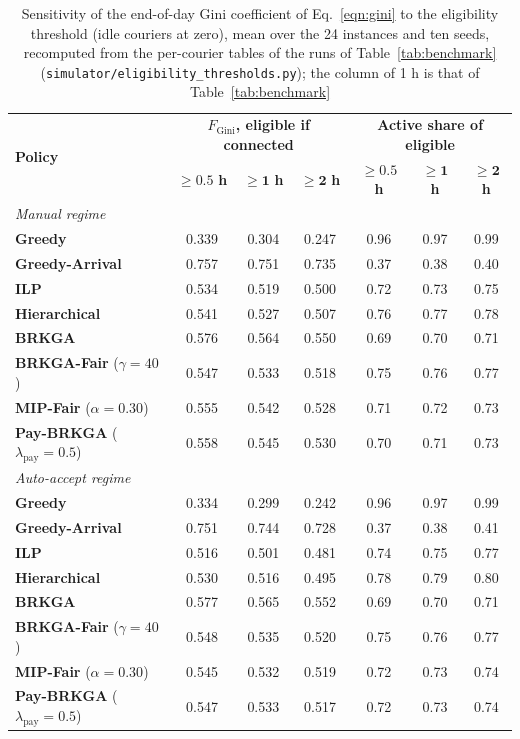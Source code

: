 \documentclass[a4paper,11pt,review,3p,authoryear]{elsarticle}
\newcommand{\FG}{F_{\text{Gini}}}
\begin{document}
\begin{table}[htbp]
\centering
\small
\begin{tabular}{l|ccc|ccc}
\hline
\multirow{2}{*}{\textbf{Policy}} & \multicolumn{3}{c|}{$\FG$\textbf{, eligible if connected}} & \multicolumn{3}{c}{\textbf{Active share of eligible}} \\
 & $\boldsymbol{\ge 0.5}$ \textbf{h} & $\boldsymbol{\ge 1}$ \textbf{h} & $\boldsymbol{\ge 2}$ \textbf{h} & $\boldsymbol{\ge 0.5}$ \textbf{h} & $\boldsymbol{\ge 1}$ \textbf{h} & $\boldsymbol{\ge 2}$ \textbf{h} \\
\hline
\multicolumn{7}{l}{\textit{Manual regime}} \\
\textbf{Greedy} & 0.339 & 0.304 & 0.247 & 0.96 & 0.97 & 0.99 \\
\textbf{Greedy-Arrival} & 0.757 & 0.751 & 0.735 & 0.37 & 0.38 & 0.40 \\
\textbf{ILP} & 0.534 & 0.519 & 0.500 & 0.72 & 0.73 & 0.75 \\
\textbf{Hierarchical} & 0.541 & 0.527 & 0.507 & 0.76 & 0.77 & 0.78 \\
\textbf{BRKGA} & 0.576 & 0.564 & 0.550 & 0.69 & 0.70 & 0.71 \\
\textbf{BRKGA-Fair} ($\gamma = 40$) & 0.547 & 0.533 & 0.518 & 0.75 & 0.76 & 0.77 \\
\textbf{MIP-Fair} ($\alpha = 0.30$) & 0.555 & 0.542 & 0.528 & 0.71 & 0.72 & 0.73 \\
\textbf{Pay-BRKGA} ($\lambda_{\text{pay}} = 0.5$) & 0.558 & 0.545 & 0.530 & 0.70 & 0.71 & 0.73 \\
\hline
\multicolumn{7}{l}{\textit{Auto-accept regime}} \\
\textbf{Greedy} & 0.334 & 0.299 & 0.242 & 0.96 & 0.97 & 0.99 \\
\textbf{Greedy-Arrival} & 0.751 & 0.744 & 0.728 & 0.37 & 0.38 & 0.41 \\
\textbf{ILP} & 0.516 & 0.501 & 0.481 & 0.74 & 0.75 & 0.77 \\
\textbf{Hierarchical} & 0.530 & 0.516 & 0.495 & 0.78 & 0.79 & 0.80 \\
\textbf{BRKGA} & 0.577 & 0.565 & 0.552 & 0.69 & 0.70 & 0.71 \\
\textbf{BRKGA-Fair} ($\gamma = 40$) & 0.548 & 0.535 & 0.520 & 0.75 & 0.76 & 0.77 \\
\textbf{MIP-Fair} ($\alpha = 0.30$) & 0.545 & 0.532 & 0.519 & 0.72 & 0.73 & 0.74 \\
\textbf{Pay-BRKGA} ($\lambda_{\text{pay}} = 0.5$) & 0.547 & 0.533 & 0.517 & 0.72 & 0.73 & 0.74 \\
\hline
\end{tabular}
\caption{Sensitivity of the end-of-day Gini coefficient of Eq.~\eqref{eqn:gini} to the eligibility threshold (idle couriers at zero), mean over the 24 instances and ten seeds, recomputed from the per-courier tables of the runs of Table~\ref{tab:benchmark} (\texttt{simulator/eligibility\_thresholds.py}); the column of 1 h is that of Table~\ref{tab:benchmark}}
\label{tab:eligibility}
\end{table}
\end{document}
